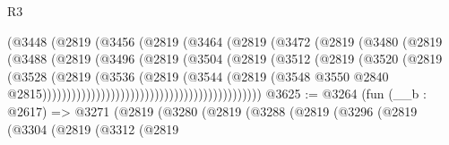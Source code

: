 \begin{lexlean}{R3}
\begin{coremodule}
                                        (@3448
                                          (@2819
                                            (@3456
                                              (@2819
                                                (@3464
                                                  (@2819
                                                    (@3472
                                                      (@2819
                                                        (@3480
                                                          (@2819
                                                            (@3488
                                                              (@2819
                                                                (@3496
                                                                  (@2819
                                                                    (@3504
                                                                      (@2819
                                                                        (@3512
                                                                          (@2819
                                                                            (@3520
                                                                              (@2819
                                                                                (@3528
                                                                                  (@2819
                                                                                    (@3536
                                                                                      (@2819
                                                                                        (@3544
                                                                                          (@2819
                                                                                            (@3548
                                                                                              @3550
                                                                                              @2840
                                                                                              @2815)))))))))))))))))))))))))))))))))))))))))))))
@3625 := @3264
    (fun (__b : @2617) =>
    @3271
      (@2819
        (@3280
          (@2819
            (@3288
              (@2819
                (@3296
                  (@2819
                    (@3304
                      (@2819
                        (@3312
                          (@2819

\end{coremodule}
\end{lexlean}
